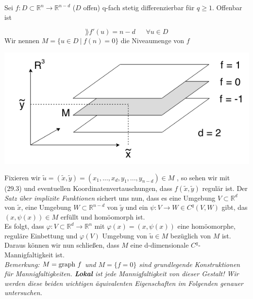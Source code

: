 \begin{beispiel}
Sei $f:D\subset\mathbb{R}^n\rightarrow\mathbb{R}^{n-d}$ ($D$ offen) q-fach stetig differenzierbar für $q\geq 1$. Offenbar ist

\begin{equation}
\rang f'(u)=n-d \ \ \ \ \ \ \ \forall u\in D
\end{equation}
Wir nennen $M=\{u\in D \ | \ f(n)=0\}$ die Niveaumenge von $f$\\

\begin{center}\includegraphics[scale=0.5]{pictures/001-09}\\
\end{center}

Fixieren wir $\tilde{u}=(\tilde{x},\tilde{y})=(x_1,...,x_d,y_1,...,y_{n-d})\in M$
, so sehen wir mit (29.3) und eventuellen Koordinatenvertauschungen, dass 
$f(\tilde{x},\tilde{y})$ regulär ist. Der \emph{Satz über implizite Funktionen}
sichert uns nun, dass es eine Umgebung $V\subset\mathbb{R}^d$ von $\tilde{x}$, 
eine Umgebung $W\subset\mathbb{R}^{n-d}$ von $\tilde{y}$ und ein 
$\psi:V\rightarrow W\in C^q(V,W)$ gibt, das $(x,\psi(x))\in M$ erfüllt und homöomorph ist.\\
Es folgt, dass $\varphi:V\subset\mathbb{R}^d\rightarrow\mathbb{R}^n$ mit
$\varphi(x)=(x,\psi(x))$ eine homöomorphe, reguläre Einbettung  und $\varphi(V)$ 
Umgebung von $\tilde{u}\in M$ bezüglich von $M$ ist. Daraus können wir nun schließen, 
dass $M$ eine d-dimensionale $C^q$-Mannigfaltigkeit ist.\\
\linebreak
\emph{Bemerkung: $M=\text{graph\ } f$ und $M=\{f=0\}$ sind grundlegende Konstruktionen 
für Mannigfaltigkeiten. \textbf{Lokal} ist jede Mannigfaltigkeit von dieser Gestalt! Wir werden diese beiden wichtigen äquivalenten Eigenschaften im Folgenden genauer untersuchen.}
\end{beispiel}
